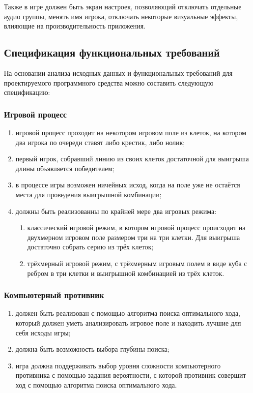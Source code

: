 Также в игре должен быть экран настроек, позволяющий отключать отдельные аудио группы, менять имя игрока, отключать некоторые визуальные эффекты, влияющие на производительность приложения.


\subsection{Спецификация функциональных требований}

На основании анализа исходных данных и функциональных требований для проектируемого программного средства можно составить следующую спецификацию:


\subsubsection{Игровой процесс}

\begin{enumerate}
    \item игровой процесс проходит на некотором игровом поле из клеток, на котором два игрока по очереди ставят либо крестик, либо нолик;
    \item первый игрок, собравший линию из своих клеток достаточной для выигрыша длины объявляется победителем;
    \item в процессе игры возможен ничейных исход, когда на поле уже не остаётся места для проведения выигрышной комбинации;
    \item должны быть реализованны по крайней мере два игровых режима:
    \begin{enumerate}
        \item классический игровой режим, в котором игровой процесс происходит на двухмерном игровом поле размером три на три клетки. Для выигрыша достаточно собрать серию из трёх клеток;
        \item трёхмерный игровой режим, с трёхмерным игровым полем в виде куба с ребром в три клетки и выигрышной комбинацией из трёх клеток.
    \end{enumerate}
\end{enumerate}


\subsubsection{Компьютерный противник}

\begin{enumerate}
    \item должен быть реализован с помощью алгоритма поиска оптимального хода, который должен уметь анализировать игровое поле и находить лучшие для себя исходы игры;
    \item должна быть возможность выбора глубины поиска;
    \item игра должна поддерживать выбор уровня сложности компьютерного противника с помощью задания вероятности, с которой противник совершит ход с помощью алгоритма поиска оптимального хода.
\end{enumerate}


